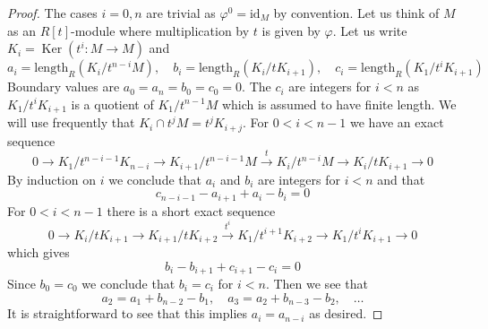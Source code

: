 \documentclass[10pt,a4paper]{amsart}
\theoremstyle{plain}
\theoremstyle{definition}
\theoremstyle{remark}
\numberwithin{equation}{subsection}
\def\Ker{\mathop{\mathrm{Ker}}}
\begin{document}
\begin{proof}
The cases $i = 0, n$ are trivial as $\varphi^0 = \text{id}_M$ by convention.
Let us think of $M$ as an $R[t]$-module where multiplication by $t$
is given by $\varphi$. Let us write
$K_i = \Ker(t^i : M \to M)$ and
$$
a_i = \text{length}_R(K_i/t^{n - i}M),\quad
b_i = \text{length}_R(K_i/tK_{i + 1}),\quad
c_i = \text{length}_R(K_1/t^iK_{i + 1})
$$
Boundary values are $a_0 = a_n = b_0 = c_0 = 0$.
The $c_i$ are integers for $i < n$ as $K_1/t^iK_{i + 1}$
is a quotient of $K_1/t^{n - 1}M$ which is assumed to have finite length.
We will use frequently that $K_i \cap t^jM = t^jK_{i + j}$.
For $0 < i < n - 1$ we have an exact sequence
$$
0 \to
K_1/t^{n - i - 1}K_{n - i} \to
K_{i + 1}/t^{n - i - 1}M \xrightarrow{t} K_i/t^{n - i}M
\to K_i/tK_{i + 1} \to 0
$$
By induction on $i$ we conclude that $a_i$ and $b_i$ are
integers for $i < n$ and that
$$
c_{n - i - 1} - a_{i + 1} + a_i - b_i = 0
$$
For $0 < i < n - 1$ there is a short exact sequence
$$
0 \to
K_i/tK_{i + 1} \to
K_{i + 1}/tK_{i + 2} \xrightarrow{t^i}
K_1/t^{i + 1}K_{i + 2} \to
K_1/t^iK_{i + 1} \to 0
$$
which gives
$$
b_i - b_{i + 1} + c_{i + 1} - c_i = 0
$$
Since $b_0 = c_0$ we conclude that $b_i = c_i$ for $i < n$.
Then we see that
$$
a_2 = a_1 + b_{n - 2} - b_1,\quad
a_3 = a_2 + b_{n - 3} - b_2,\quad \ldots
$$
It is straightforward to see that this implies $a_i = a_{n - i}$ as desired.
\end{proof}
\end{document}

